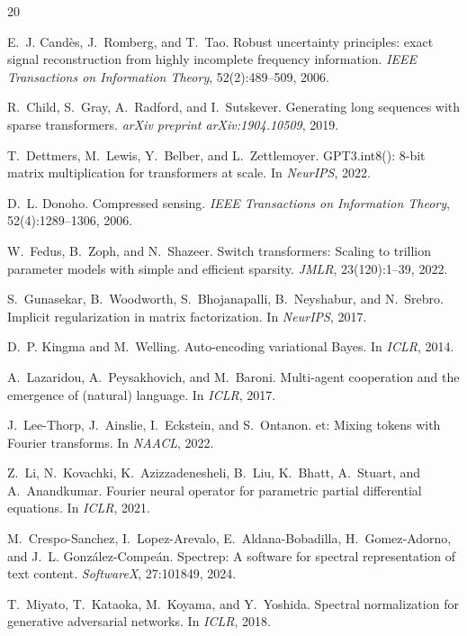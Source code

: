 \documentclass[10pt,twocolumn]{article}
\begin{document}

\begin{thebibliography}{20}

E.~J. Cand\`{e}s, J.~Romberg, and T.~Tao.
\newblock Robust uncertainty principles: exact signal reconstruction from highly
  incomplete frequency information.
\newblock \emph{IEEE Transactions on Information Theory}, 52(2):489--509, 2006.

R.~Child, S.~Gray, A.~Radford, and I.~Sutskever.
\newblock Generating long sequences with sparse transformers.
\newblock \emph{arXiv preprint arXiv:1904.10509}, 2019.

T.~Dettmers, M.~Lewis, Y.~Belber, and L.~Zettlemoyer.
\newblock GPT3.int8(): 8-bit matrix multiplication for transformers at scale.
\newblock In \emph{NeurIPS}, 2022.

D.~L. Donoho.
\newblock Compressed sensing.
\newblock \emph{IEEE Transactions on Information Theory}, 52(4):1289--1306,
  2006.

W.~Fedus, B.~Zoph, and N.~Shazeer.
\newblock Switch transformers: Scaling to trillion parameter models with simple
  and efficient sparsity.
\newblock \emph{JMLR}, 23(120):1--39, 2022.

S.~Gunasekar, B.~Woodworth, S.~Bhojanapalli, B.~Neyshabur, and N.~Srebro.
\newblock Implicit regularization in matrix factorization.
\newblock In \emph{NeurIPS}, 2017.

D.~P. Kingma and M.~Welling.
\newblock Auto-encoding variational {B}ayes.
\newblock In \emph{ICLR}, 2014.

A.~Lazaridou, A.~Peysakhovich, and M.~Baroni.
\newblock Multi-agent cooperation and the emergence of (natural) language.
\newblock In \emph{ICLR}, 2017.

J.~Lee-Thorp, J.~Ainslie, I.~Eckstein, and S.~Ontanon.
et: Mixing tokens with {F}ourier transforms.
\newblock In \emph{NAACL}, 2022.

Z.~Li, N.~Kovachki, K.~Azizzadenesheli, B.~Liu, K.~Bhatt, A.~Stuart, and
  A.~Anandkumar.
\newblock Fourier neural operator for parametric partial differential equations.
\newblock In \emph{ICLR}, 2021.

M.~Crespo-Sanchez, I.~Lopez-Arevalo, E.~Aldana-Bobadilla, H.~Gomez-Adorno,
  and J.~L. Gonz\'{a}lez-Compe\'{a}n.
\newblock Spectrep: A software for spectral representation of text content.
\newblock \emph{SoftwareX}, 27:101849, 2024.

T.~Miyato, T.~Kataoka, M.~Koyama, and Y.~Yoshida.
\newblock Spectral normalization for generative adversarial networks.
\newblock In \emph{ICLR}, 2018.

\end{thebibliography}
\end{document}
